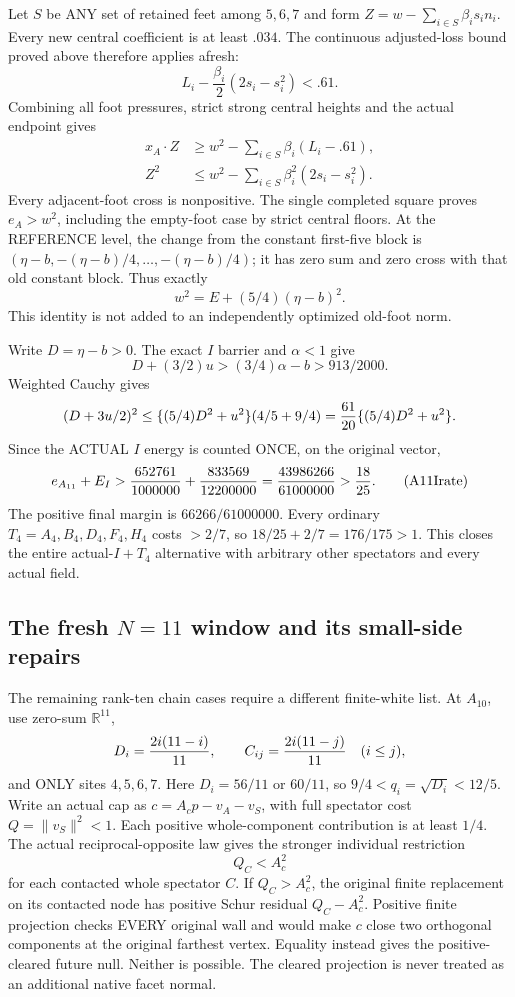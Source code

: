 Let \(S\) be ANY set of retained feet among
\(5,6,7\) and form
\(Z=w-\sum_{i\in S}\beta_i s_i n_i\).
Every new central coefficient is at least
\(.034\).
The continuous adjusted-loss bound proved
above therefore applies afresh:
\[
 L_i-\frac{\beta_i}{2}(2s_i-s_i^2)<.61 .
\]
Combining all foot pressures, strict strong
central heights and the actual endpoint gives
\[
 \begin{split}
 x_A\cdot Z&\ge w^2-\sum_{i\in S}\beta_i(L_i-.61),\\
 Z^2&\le w^2-\sum_{i\in S}\beta_i^2(2s_i-s_i^2).
 \end{split}
\]
Every adjacent-foot cross is nonpositive.
The single completed square proves \(e_A>w^2\),
including the empty-foot case by strict
central floors.
At the REFERENCE level, the change from
the constant first-five block is
\((\eta-b,-(\eta-b)/4,\ldots,-(\eta-b)/4)\);
it has zero sum and zero cross with that
old constant block.
Thus exactly
\[
                      w^2=E+(5/4)(\eta-b)^2 .
\]
This identity is not added to an independently
optimized old-foot norm.

Write \(D=\eta-b>0\).
The exact \(I\) barrier and \(\alpha<1\) give
\[
 D+(3/2)u>(3/4)\alpha-b>913/2000 .
\]
Weighted Cauchy gives
\[
 (D+3u/2)^2
       \le\{(5/4)D^2+u^2\}(4/5+9/4)
       ={61\over20}\{(5/4)D^2+u^2\}.
\]
Since the ACTUAL \(I\) energy is counted
ONCE, on the original vector,
\[
 e_{A_{11}}+E_I
 >{652761\over1000000}+{833569\over12200000}
 ={43986266\over61000000}>{18\over25}.
\tag{A11Irate}\label{eq:arithA11Ijoint}
\]
The positive final margin is
\(66266/61000000\).
Every ordinary \(T_4=A_4,B_4,D_4,F_4,H_4\)
costs \(>2/7\), so
\(18/25+2/7=176/175>1\).
This closes the entire actual-\(I+T_4\)
alternative with arbitrary other spectators
and every actual field.

\subsection{The fresh \(N=11\) window and its small-side repairs}
\label{app:arithA10window}

The remaining rank-ten chain cases require a
different finite-white list.
At \(A_{10}\), use zero-sum \(\mathbb R^{11}\),
\[
 D_i={2i(11-i)\over11},\qquad
 C_{ij}={2i(11-j)\over11}\quad(i\le j),
\]
and ONLY sites \(4,5,6,7\).
Here \(D_i=56/11\) or \(60/11\), so
\(9/4<q_i=\sqrt{D_i}<12/5\).
Write an actual cap as
\(c=A_cp-v_A-v_S\), with full spectator
cost \(Q=\|v_S\|^2<1\).
Each positive whole-component contribution
is at least \(1/4\).
The actual reciprocal-opposite law gives the
stronger individual restriction
\[
                         Q_C<A_c^2
\tag{A10foreign}\label{eq:arithA10foreign}
\]
for each contacted whole spectator \(C\).
If \(Q_C>A_c^2\), the original finite
replacement on its contacted node has
positive Schur residual \(Q_C-A_c^2\).
Positive finite projection checks EVERY
original wall and would make \(c\) close
two orthogonal components at the original
farthest vertex.
Equality instead gives the positive-cleared
future null.
Neither is possible.
The cleared projection is never treated as
an additional native facet normal.

